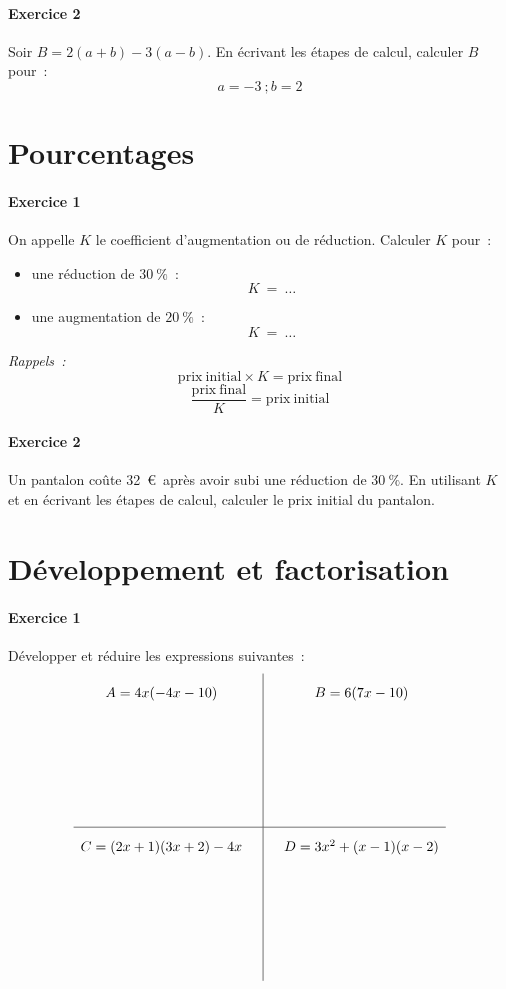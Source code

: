 \documentclass[a4paper]{article}
\begin{document}
  \paragraph{Exercice 2}
  Soir $B = 2 (a + b) - 3 (a - b)$. En écrivant les étapes de calcul, calculer $B$ pour~:
  \[
    a = -3~; b = 2
  \]
  \vspace{2cm}

  \section*{Pourcentages}
  \paragraph{Exercice 1}
  On appelle $K$ le coefficient d'augmentation ou de réduction. Calculer $K$ pour~:
  \begin{itemize}
    \item une réduction de $30~\%$~:
      \[
        K \ =\ \dots
      \]
    \item une augmentation de $20~\%$~:
      \[
        K \ =\ \dots
      \]
  \end{itemize}
  \emph{Rappels~:}
  \[
    \mathrm{prix\ initial} \times K = \mathrm{prix\ final}
  \]
  \[
    \frac{\mathrm{prix\ final}}{K} = \mathrm{prix\ initial}
  \]

  \paragraph{Exercice 2}
  Un pantalon coûte 32~\euro\ après avoir subi une réduction de $30~\%$. En utilisant $K$ et en écrivant les étapes de calcul, calculer le prix initial du pantalon.
  \vspace{3cm}

  \section*{Développement et factorisation}
  \paragraph{Exercice 1}
  Développer et réduire les expressions suivantes~:
  \[
    \def\arraystretch{2}
    \begin{array}{c|c}
      A = 4x (-4x - 10) \quad&\quad B = 6(7x - 10)\\[3cm]
      \hline
      C = (2x + 1)(3x + 2) - 4x \quad&\quad D = 3x^2 + (x - 1)(x - 2)\\[3cm]
    \end{array}
  \]
\end{document}
